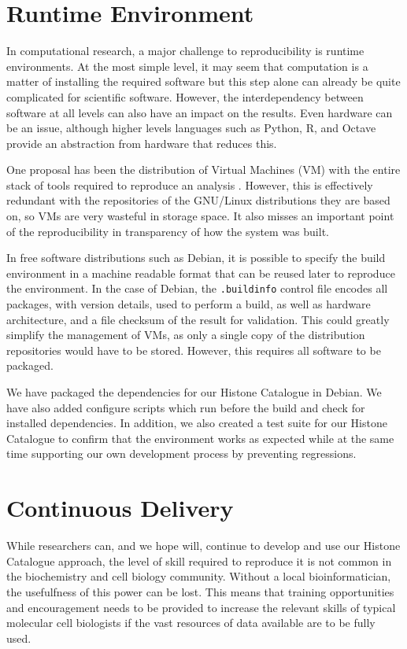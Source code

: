 \section{Runtime Environment}

In computational research, a major challenge to
reproducibility is
runtime environments.  At the most simple level, it may seem that
computation is a
matter of installing the required software but this step alone can
already be quite complicated for
scientific software.
However, the
interdependency between software at all levels can also have an impact on
the results.  Even hardware can be an issue, although higher levels
languages such as Python, R, and Octave provide an abstraction from
hardware that reduces this.

One proposal has been the distribution of Virtual Machines (VM) with
the entire stack of tools required to reproduce an
analysis \citep{hurley2015virtual, angiuoli2011clovr}.
However, this is effectively redundant with
the repositories of the GNU/Linux distributions they are based on, so VMs
are very wasteful in storage space.  It also misses an important point of
the reproducibility in transparency of how the system was built.

In free software distributions such as Debian, it is possible to
specify the build environment in a machine readable format that can be
reused later to reproduce the environment.  In the case of Debian,
the \texttt{.buildinfo} control file encodes all packages, with
version details, used to perform a build, as well as hardware
architecture, and a file checksum of the result for validation.  This
could greatly simplify the management of VMs, as only a single
copy of the distribution repositories would have to be stored.
However, this requires all software to be packaged.

We have packaged the dependencies for our Histone
Catalogue in Debian.  We have also added configure scripts which run
before the build and check for installed dependencies.  In addition,
we also created a test suite for our Histone Catalogue to confirm that
the environment works as expected while at the same time supporting our own
development process by preventing regressions.

\section{Continuous Delivery}

While researchers can, and we hope will, continue to develop and use our
Histone Catalogue approach, the level of skill required to reproduce it is not
common in the biochemistry and cell biology community.
Without a local bioinformatician, the
usefulfness of this power can be lost.  This means that training
opportunities and encouragement needs to be provided to increase the
relevant skills of typical molecular cell biologists if the vast
resources of data available are to be fully used.

